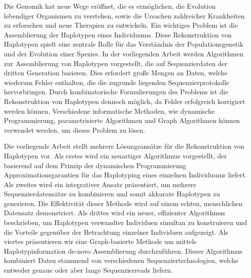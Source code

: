 Die Genomik hat neue Wege eröffnet, die es ermöglichen, die Evolution lebendiger Organismen zu verstehen, sowie die Ursachen zahlreicher Krankheiten zu erforschen und neue Therapien zu entwickeln.
Ein wichtiges Problem ist die Assemblierung der Haplotypen eines Individuums. Diese Rekonstruktion von Haplotypen spielt eine zentrale Rolle für das Verständnis der Populationsgenetik und der Evolution einer Spezies.
In der vorliegenden Arbeit werden Algorithmen zur Assemblierung von Haplotypen vorgestellt, die auf Sequenzierdaten der dritten Generation basieren. Dies erfordert große Mengen an Daten, welche wiederum Fehler enthalten,
die die zugrunde liegenden Sequenzierprotokolle hervorbringen. Durch kombinatorische Formulierungen des Problems ist die Rekonstruktion von Haplotypen dennoch möglich, da Fehler erfolgreich korrigiert werden können.
Verschiedene informatische Methoden, wie dynamische Programmierung, parametrisierte Algorithmen und Graph Algorithmen können verwendet werden, um dieses Problem zu lösen.

Die vorliegende Arbeit stellt mehrere Lösungsansätze für die Rekonstruktion von Haplotypen vor.
Als erstes wird ein neuartiger Algorithmus vorgestellt, der basierend auf dem Prinzip der dynamischen Programmierung Approximationsgarantien für das Haplotyping eines einzelnen Individuums
liefert.
Als zweites wird ein integrativer Ansatz präsentiert, um mehrere Sequenzierdatensätze zu kombinieren und somit akkurate Haplotypen zu generieren.
Die Effektivität dieser Methode wird auf einem echten, menschlichen Datensatz demonstriert.
Als drittes wird ein neuer, effizienter Algorithmus beschrieben, um Haplotypen verwandter Individuen simultan zu konstruieren und die Vorteile gegenüber der Betrachtung einzelner Individuen aufgezeigt.
Als viertes präsentieren wir eine Graph-basierte Methode um mittels Haplotypinformation de-novo Assemblierung durchzuführen. Dieser Algorithmus kombiniert Daten stammend von verschiedenen Sequenziertechnologien, welche entweder
genaue oder aber lange Sequenzierreads liefern.


 


